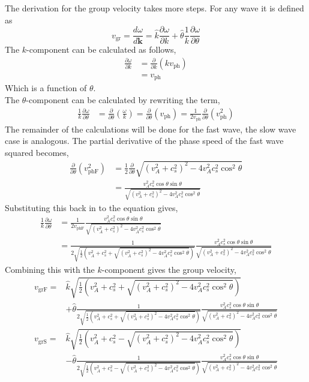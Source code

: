 \documentclass{article}
\begin{document}
The derivation for the group velocity takes more steps. For any wave it is defined as 
\begin{equation*}
    v_{\text{gr}} = \frac{d\omega}{d\mathbf{k}} = \hat{k}\frac{\partial\omega}{\partial k} + \hat{\theta} \frac{1}{k}\frac{\partial\omega}{\partial\theta}
\end{equation*}
The $k$-component can be calculated as follows,
\begin{align*}
    \frac{\partial \omega}{\partial k} &= \frac{\partial}{\partial k}\left(kv_{\text{ph}}\right)\\
    &= v_{\text{ph}}
\end{align*}
Which is a function of $\theta$.\\
The $\theta$-component can be calculated by rewriting the term,
\begin{align*}
    \frac{1}{k}\frac{\partial \omega}{\partial \theta} &= \frac{\partial}{\partial \theta}\left(\frac{\omega}{k}\right)
    = \frac{\partial}{\partial \theta}(v_{\text{ph}}) = \frac{1}{2v_{\text{ph}}} \frac{\partial}{\partial \theta}(v^2_{\text{ph}})
\end{align*}
The remainder of the calculations will be done for the fast wave, the slow wave case is analogous. The partial derivative of the phase speed of the fast wave squared becomes,
\begin{align*}
     \frac{\partial}{\partial \theta}(v^2_{\text{phF}})&= \frac{1}{2}\frac{\partial}{\partial \theta} \sqrt{(v_A^2 + c_s^2)^2 - 4v_A^2c_s^2\cos^2\theta}\\
     &= \frac{v_A^2c_s^2\cos\theta\sin\theta}{\sqrt{(v_A^2 + c_s^2)^2 - 4v_A^2c_s^2\cos^2\theta}}
\end{align*}
Substituting this back in to the equation gives,
\begin{align*}
     \frac{1}{k}\frac{\partial \omega}{\partial \theta} &= \frac{1}{2v_{\text{phF}}}  \frac{v_A^2c_s^2\cos\theta\sin\theta}{\sqrt{(v_A^2 + c_s^2)^2 - 4v_A^2c_s^2\cos^2\theta}}\\
     &= \frac{1}{2\sqrt{\frac{1}{2}\left(v_A^2 + c_s^2 + \sqrt{(v_A^2 + c_s^2)^2 - 4v_A^2c_s^2\cos^2\theta}\right)}}\frac{v_A^2c_s^2\cos\theta\sin\theta}{\sqrt{(v_A^2 + c_s^2)^2 - 4v_A^2c_s^2\cos^2\theta}}
\end{align*}
Combining this with the $k$-component gives the group velocity,
\begin{align*}
    v_\text{grF} = &\hat{k}\sqrt{\frac{1}{2}\left(v_A^2 + c_s^2 + \sqrt{(v_A^2 + c_s^2)^2 - 4v_A^2c_s^2\cos^2\theta}\right)}\\ &+ \hat{\theta}\frac{1}{2\sqrt{\frac{1}{2}\left(v_A^2 + c_s^2 + \sqrt{(v_A^2 + c_s^2)^2 - 4v_A^2c_s^2\cos^2\theta}\right)}}\frac{v_A^2c_s^2\cos\theta\sin\theta}{\sqrt{(v_A^2 + c_s^2)^2 - 4v_A^2c_s^2\cos^2\theta}}\\
    v_\text{grS} = &\hat{k}\sqrt{\frac{1}{2}\left(v_A^2 + c_s^2 - \sqrt{(v_A^2 + c_s^2)^2 - 4v_A^2c_s^2\cos^2\theta}\right)}\\ &- \hat{\theta}\frac{1}{2\sqrt{\frac{1}{2}\left(v_A^2 + c_s^2 - \sqrt{(v_A^2 + c_s^2)^2 - 4v_A^2c_s^2\cos^2\theta}\right)}}\frac{v_A^2c_s^2\cos\theta\sin\theta}{\sqrt{(v_A^2 + c_s^2)^2 - 4v_A^2c_s^2\cos^2\theta}}
\end{align*}
\end{document}
